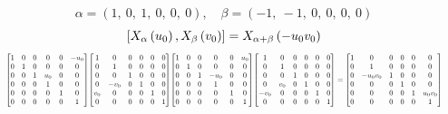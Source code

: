 \documentclass[11pt]{article}
\theoremstyle{definition}
\begin{document}
\[
\alpha = \left( 1, \  0, \  1, \  0, \  0, \  0\right), \quad \beta = \left( -1, \  -1, \  0, \  0, \  0, \  0\right)
\]
\[
\scaletoalign{\textwidth}{\left[ X_{\alpha}\left(u_{0}\right), X_{\beta}\left(v_{0}\right) \right] = X_{\alpha + \beta}\left(- u_{0} v_{0}\right)}
\]
\[
\scaletoalign{\textwidth}{{\left[\begin{matrix}1 & 0 & 0 & 0 & 0 & - u_{0}\\0 & 1 & 0 & 0 & 0 & 0\\0 & 0 & 1 & u_{0} & 0 & 0\\0 & 0 & 0 & 1 & 0 & 0\\0 & 0 & 0 & 0 & 1 & 0\\0 & 0 & 0 & 0 & 0 & 1\end{matrix}\right]} {\left[\begin{matrix}1 & 0 & 0 & 0 & 0 & 0\\0 & 1 & 0 & 0 & 0 & 0\\0 & 0 & 1 & 0 & 0 & 0\\0 & - v_{0} & 0 & 1 & 0 & 0\\v_{0} & 0 & 0 & 0 & 1 & 0\\0 & 0 & 0 & 0 & 0 & 1\end{matrix}\right]} {\left[\begin{matrix}1 & 0 & 0 & 0 & 0 & u_{0}\\0 & 1 & 0 & 0 & 0 & 0\\0 & 0 & 1 & - u_{0} & 0 & 0\\0 & 0 & 0 & 1 & 0 & 0\\0 & 0 & 0 & 0 & 1 & 0\\0 & 0 & 0 & 0 & 0 & 1\end{matrix}\right]} {\left[\begin{matrix}1 & 0 & 0 & 0 & 0 & 0\\0 & 1 & 0 & 0 & 0 & 0\\0 & 0 & 1 & 0 & 0 & 0\\0 & v_{0} & 0 & 1 & 0 & 0\\- v_{0} & 0 & 0 & 0 & 1 & 0\\0 & 0 & 0 & 0 & 0 & 1\end{matrix}\right]} = {\left[\begin{matrix}1 & 0 & 0 & 0 & 0 & 0\\0 & 1 & 0 & 0 & 0 & 0\\0 & - u_{0} v_{0} & 1 & 0 & 0 & 0\\0 & 0 & 0 & 1 & 0 & 0\\0 & 0 & 0 & 0 & 1 & u_{0} v_{0}\\0 & 0 & 0 & 0 & 0 & 1\end{matrix}\right]}}
\]
\end{document}
